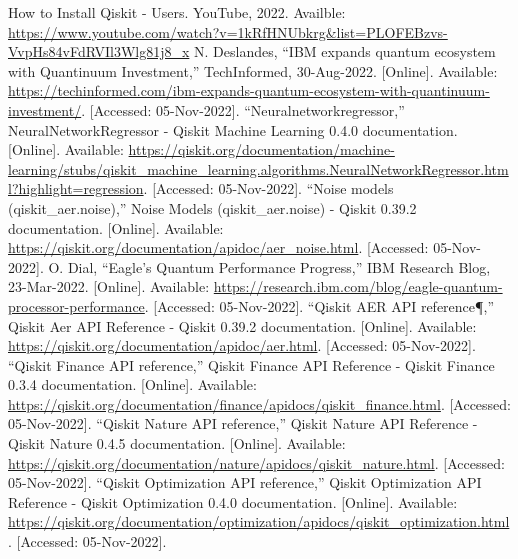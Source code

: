 \documentclass[conference]{IEEEtran}
\begin{document}
\begin{thebibliography}{00}
How to Install Qiskit - Users. YouTube, 2022. Availble: \href{https://www.youtube.com/watch?v=1kRfHNUbkrg&list=PLOFEBzvs-VvpHs84vFdRVIl3Wlg81j8_x}{https://www.youtube.com/watch?v=1kRfHNUbkrg&list=PLOFEBzvs-VvpHs84vFdRVIl3Wlg81j8_x}
N. Deslandes, “IBM expands quantum ecosystem with Quantinuum Investment,” TechInformed, 30-Aug-2022. [Online]. Available: \href{https://techinformed.com/ibm-expands-quantum-ecosystem-with-quantinuum-investment/}{https://techinformed.com/ibm-expands-quantum-ecosystem-with-quantinuum-investment/}. [Accessed: 05-Nov-2022]. 
“Neuralnetworkregressor,” NeuralNetworkRegressor - Qiskit Machine Learning 0.4.0 documentation. [Online]. Available: \href{https://qiskit.org/documentation/machine-learning/stubs/qiskit_machine_learning.algorithms.NeuralNetworkRegressor.html?highlight=regression}{https://qiskit.org/documentation/machine-learning/stubs/qiskit_machine_learning.algorithms.NeuralNetworkRegressor.html?highlight=regression}. [Accessed: 05-Nov-2022]. 
“Noise models (qiskit\_aer.noise),” Noise Models (qiskit\_aer.noise) - Qiskit 0.39.2 documentation. [Online]. Available: \href{https://qiskit.org/documentation/apidoc/aer_noise.html}{https://qiskit.org/documentation/apidoc/aer_noise.html}. [Accessed: 05-Nov-2022]. 
O. Dial, “Eagle's Quantum Performance Progress,” IBM Research Blog, 23-Mar-2022. [Online]. Available: \href{https://research.ibm.com/blog/eagle-quantum-processor-performance}{https://research.ibm.com/blog/eagle-quantum-processor-performance}. [Accessed: 05-Nov-2022]. 
“Qiskit AER API reference¶,” Qiskit Aer API Reference - Qiskit 0.39.2 documentation. [Online]. Available: \href{https://qiskit.org/documentation/apidoc/aer.html}{https://qiskit.org/documentation/apidoc/aer.html}. [Accessed: 05-Nov-2022]. 
“Qiskit Finance API reference,” Qiskit Finance API Reference - Qiskit Finance 0.3.4 documentation. [Online]. Available: \href{https://qiskit.org/documentation/finance/apidocs/qiskit_finance.html}{https://qiskit.org/documentation/finance/apidocs/qiskit_finance.html}. [Accessed: 05-Nov-2022]. 
“Qiskit Nature API reference,” Qiskit Nature API Reference - Qiskit Nature 0.4.5 documentation. [Online]. Available: \href{https://qiskit.org/documentation/nature/apidocs/qiskit_nature.html}{https://qiskit.org/documentation/nature/apidocs/qiskit_nature.html}. [Accessed: 05-Nov-2022]. 
“Qiskit Optimization API reference,” Qiskit Optimization API Reference - Qiskit Optimization 0.4.0 documentation. [Online]. Available: \href{https://qiskit.org/documentation/optimization/apidocs/qiskit_optimization.html}{https://qiskit.org/documentation/optimization/apidocs/qiskit_optimization.html}. [Accessed: 05-Nov-2022]. 

\end{thebibliography}
\end{document}
